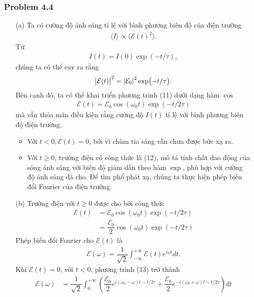 \documentclass{report}
\newcommand{\f}[2]{\dfrac{#1}{#2}}
\begin{document}
\subsubsection*{Problem 4.4}
\begin{enumerate}
	\item[(a)] Ta có cường độ ánh sáng tỉ lệ với bình phương biên độ của điện trường
	\begin{align}
		\langle I \rangle \propto  \langle \mathcal{E}(t)^2 \rangle.
	\end{align}
	Từ
	\begin{align}
		I(t) = I(0) \exp(-t/\tau),
	\end{align}
	chúng ta có thể suy ra rằng
	\begin{align}
		\abs{\mathcal{E}(t)}^2 = \abs{\mathcal{E}_0}^2 \exp(-t/\tau).
	\end{align}
	Bên cạnh đó, ta có thể khai triển phương trình (11) dưới dạng hàm $\cos$
	\begin{align}
		\mathcal{E}(t) = \mathcal{E}_0 \cos(\omega_0 t) \exp(-t/2\tau)
	\end{align}
	mà vẫn thỏa mãn điều kiện rằng cường độ $I(t)$ tỉ lệ với bình phương biên độ điện trường.
	\begin{itemize}
		\item Với $t<0, \mathcal{E}(t) = 0$, bởi vì chùm tia sáng vẫn chưa được bức xạ ra.
		\item Với $t \geq 0$, trường điện có công thức là (12), mô tả tính chất dao động của sóng ánh sáng với biên độ giảm dần theo hàm $\exp$, phù hợp với cường độ ánh sáng đã cho. Để tìm phổ phát xạ, chúng ta thực hiện phép biến đổi Fourier của điện trường.
	\end{itemize}
	\item[(b)] Trường điện với $t \geq 0$ được cho bởi công thức
	\begin{align*}
		\mathcal{E}(t)
		& = \mathcal{E}_0 \cos(\omega_0 t) \exp(-t/2\tau)        \\
		& = \f{\mathcal{E}_0}{2} \cos(\omega_0 t) \exp(-t/2\tau)
	\end{align*}
	Phép biển đổi Fourier cho $\mathcal{E}(t)$ là
	\begin{align}
		\mathcal{E}(\omega) = \f{1}{\sqrt{2}} \int_{-\infty}^{+\infty} \mathcal{E}(t) e^{i\omega t} dt.
	\end{align}
	Khi $\mathcal{E}(t) = 0$, với $t < 0$, phương trình (13) trở thành
	\begin{align}
		\mathcal{E}(\omega)
		& = \f{1}{\sqrt{2}} \int_{0}^{+\infty} \left( \f{\mathcal{E}_0}{2} e^{i(\omega_0 - \omega)t - t/2\tau} + \f{\mathcal{E}_0}{2} e^{-i(\omega_0 + \omega)t - t/2\tau} \right) dt \nonumber \\

\end{align}
\end{enumerate}
\end{document}
